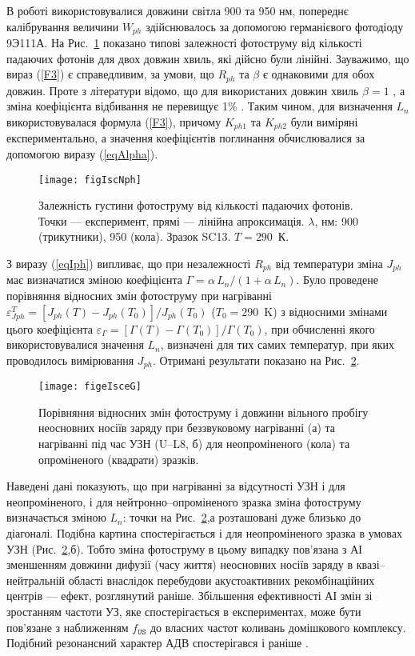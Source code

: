 В роботі використовувалися довжини світла 900 та 950 нм,
попереднє калібрування величини $W_{ph}$ здійснювалось
за допомогою германієвого фотодіоду 9Э111А.
На Рис.~\ref{figIscNph} показано типові залежності фотоструму від
кількості падаючих фотонів для двох довжин хвиль,
які дійсно були лінійні.
Зауважимо, що вираз (\ref{F3}) є справедливим,
за умови, що $R_{ph}$ та $\beta$ є однаковими для обох довжин.
Проте з літератури відомо, що для використаних довжин хвиль
$\beta=1$ \cite{Gaman}, а зміна коефіцієнта відбивання не перевищує 1\% \cite{GreenOptic,SiOptic:JAP1998,GreenOptic2}.
Таким чином, для визначення $L_n$ використовувалася формула (\ref{F3}),
причому $K_{ph1}$ та $K_{ph2}$ були виміряні експериментально, а значення
коефіцієнтів поглинання обчислювалися за допомогою виразу (\ref{eqAlpha}).

\begin{figure}
\center
\texttt{[image: figIscNph]}
\caption{\label{figIscNph}
Залежність густини фотоструму від кількості падаючих фотонів.
Точки --- експеримент, прямі --- лінійна апроксимація.
$\lambda$, нм: 900 (трикутники), 950 (кола). Зразок SC13. $T = 290$~К.
}%
\end{figure}

З виразу (\ref{eqIph}) випливає, що при незалежності $R_{ph}$ від температури
зміна $J_{ph}$ має визначатися зміною
коефіцієнта $\Gamma=\alpha\,L_n/(1+\alpha\,L_n)$.
Було проведене порівняння відносних змін
фотоструму при нагріванні $\varepsilon^T_{Jph}=[J_{ph}(T)-J_{ph}(T_0)]/J_{ph}(T_0)$
($T_0=290$~K)
з відносними змінами цього коефіцієнта $\varepsilon_\Gamma=[\Gamma(T)-\Gamma(T_0)]/\Gamma(T_0)$,
при обчисленні якого використовувалися значення  $L_n$, визначені
для тих самих температур, при яких проводилось вимірювання $J_{ph}$.
Отримані результати показано на Рис.~\ref{figeIsceG}.


\begin{figure}
\center
\texttt{[image: figeIsceG]}
\caption{\label{figeIsceG}
Порівняння відносних змін фотоструму і довжини
вільного пробігу неосновних носіїв заряду при беззвуковому
нагріванні (а) та нагріванні під час УЗН (U--L8, б)
для неопроміненого (кола) та опроміненого (квадрати) зразків.
}%
\end{figure}

Наведені дані показують, що при нагріванні за відсутності УЗН і для неопроміненого,
і для нейтронно--опроміненого зразка зміна фотоструму визначається зміною
$L_n$:
точки на Рис.~\ref{figeIsceG},а розташовані дуже близько до діагоналі.
Подібна картина спостерігається і для неопроміненого зразка в
умовах УЗН (Рис.~\ref{figeIsceG},б).
Тобто зміна фотоструму в цьому випадку пов'язана з АІ зменшенням
довжини дифузії (часу життя) неосновних носіїв заряду в квазі--нейтральній
області внаслідок перебудови акустоактивних рекомбінаційних центрів ---
ефект, розглянутий раніше.
Збільшення ефективності АІ змін зі зростанням частоти УЗ, яке
спостерігається в експериментах, може бути пов'язане з наближенням
$f_\mathtt{US}$ до власних частот коливань домішкового комплексу.
Подібний резонансний характер АДВ спостерігався і раніше \cite{Ol_Shav}.




